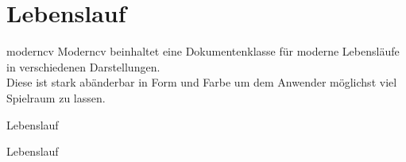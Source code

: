 \section{Lebenslauf}

\begin{frame}{moderncv}
  Moderncv beinhaltet eine Dokumentenklasse für moderne Lebensläufe in
  verschiedenen Darstellungen.\\
  Diese ist stark abänderbar in Form und Farbe um dem Anwender möglichst viel
  Spielraum zu lassen.
\end{frame}

\begin{frame}{Lebenslauf}
  \begin{Code}
    \centering
    \begin{minipage}{0.9\linewidth}
      
    \end{minipage}	
  \end{Code}
\end{frame}

\begin{frame}{Lebenslauf}
  \begin{Code}
    \centering
    \begin{minipage}{0.9\linewidth}
      
    \end{minipage}	
  \end{Code}
\end{frame}

